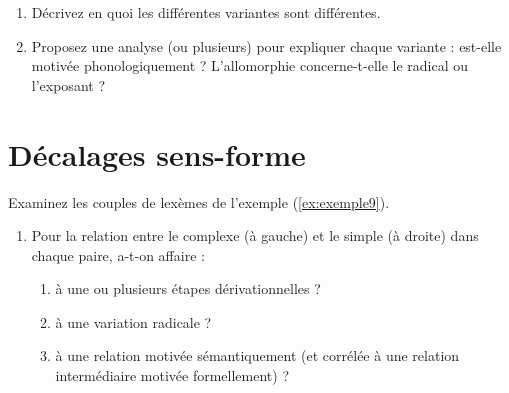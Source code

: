 \begin{exe}
  \ex \label{ex:exemple8}\exhuit
\end{exe}

\begin{enumerate}
\item Décrivez en quoi les différentes variantes sont différentes.
\item Proposez une analyse (ou plusieurs) pour expliquer chaque variante : est-elle motivée phonologiquement ? L'allomorphie concerne-t-elle le radical ou l'exposant ?
\end{enumerate}


\section{Décalages sens-forme}

Examinez les couples de lexèmes de l'exemple (\ref{ex:exemple9}).

\begin{exe}
  \ex \label{ex:exemple9}
  \begin{xlist}
    \ex \cartesianismeexneuf
    \ex \urbanismeexneuf
    \ex \historicismeexneuf
    \ex \cellularismeexneuf
  \end{xlist}
\end{exe}

\begin{enumerate}
\item Pour la relation entre le complexe (à gauche) et le simple (à droite) dans chaque paire, a-t-on affaire :
  \begin{enumerate}
  \item à une ou plusieurs étapes dérivationnelles ?
  \item à une variation radicale ?
  \item à une relation motivée sémantiquement (et corrélée à une relation intermédiaire motivée formellement) ?
  \end{enumerate}
\end{enumerate}


